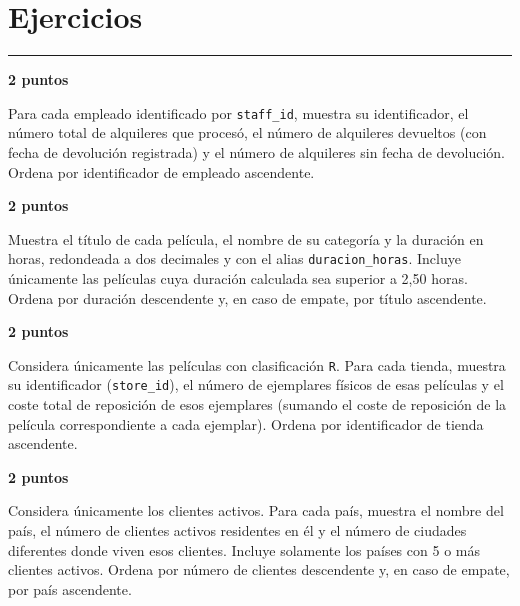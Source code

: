 \documentclass[11pt,a4paper]{article}
\begin{document}
\section*{Ejercicios}\vspace{-3mm}\color{LBcereza}\rule{\textwidth}{0.5pt}\color{LBtexto}
\par\medskip{}\hfill{\color{LBcereza}\bfseries 2 puntos}\par\smallskip
Para cada empleado identificado por \texttt{staff\_id}, muestra su identificador, el número total de alquileres que procesó, el número de alquileres devueltos (con fecha de devolución registrada) y el número de alquileres sin fecha de devolución. Ordena por identificador de empleado ascendente.\par\medskip
{}
\par\medskip{}\hfill{\color{LBcereza}\bfseries 2 puntos}\par\smallskip
Muestra el título de cada película, el nombre de su categoría y la duración en horas, redondeada a dos decimales y con el alias \texttt{duracion\_horas}. Incluye únicamente las películas cuya duración calculada sea superior a 2,50 horas. Ordena por duración descendente y, en caso de empate, por título ascendente.\par\medskip
{}
\par\medskip{}\hfill{\color{LBcereza}\bfseries 2 puntos}\par\smallskip
Considera únicamente las películas con clasificación \texttt{R}. Para cada tienda, muestra su identificador (\texttt{store\_id}), el número de ejemplares físicos de esas películas y el coste total de reposición de esos ejemplares (sumando el coste de reposición de la película correspondiente a cada ejemplar). Ordena por identificador de tienda ascendente.\par\medskip
\newpage
{}
\par\medskip{}\hfill{\color{LBcereza}\bfseries 2 puntos}\par\smallskip
Considera únicamente los clientes activos. Para cada país, muestra el nombre del país, el número de clientes activos residentes en él y el número de ciudades diferentes donde viven esos clientes. Incluye solamente los países con 5 o más clientes activos. Ordena por número de clientes descendente y, en caso de empate, por país ascendente.\par\medskip
\end{document}
